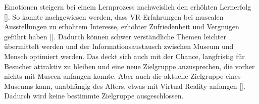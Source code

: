 \documentclass[a4paper,12pt,oneside]{article}
\begin{document}
        Emotionen steigern bei einem Lernprozess nachweislich den erhöhten Lernerfolg
        [\cite[29]{Heidsiek2019}]. So konnte nachgewiesen werden, dass VR-Erfahrungen
        bei musealen Ausstellungen zu erhöhtem Interesse, erhöhter Zufriedenheit und 
        Vergnügen geführt haben [\cite[69-72]{Heidsiek2019}]. Dadurch können schwer
        verständliche Themen leichter übermittelt werden und der Informationsaustausch
        zwischen Museum und Mensch optimiert werden. Das deckt sich auch mit der Chance,
        langfristig für Besucher attraktiv zu bleiben und eine neue Zielgruppe anzusprechen,
        die vorher nichts mit Museen anfangen konnte.
        Aber auch die aktuelle Zielgruppe eines Museums kann, unabhängig des Alters, 
        etwas mit Virtual Reality anfangen [\cite[75]{Heidsiek2019}]. Dadurch wird keine 
        bestimmte Zielgruppe ausgeschlossen.
\end{document}
